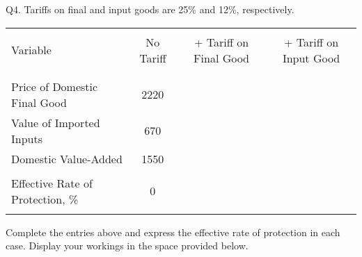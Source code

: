 \documentclass[12pt]{article}
\begin{document}
\newpage

\noindent Q4. Tariffs on final and input goods are 25\% and 12\%, respectively. 

\begin{table}[!h]
	\centering
	\begin{tabular}[t]{l c c c}
		\hline
		&&&\\
		Variable & No Tariff & + Tariff on Final Good & + Tariff on Input Good \\
		&&&\\
		\hline
		&&&\\
		Price of Domestic Final Good & 2220 & & \\
		Value of Imported Inputs & 670 & & \\
		Domestic Value-Added &	1550	&&\\
				&&&\\
		Effective Rate of Protection, \% &	0	&& \\
		&&&\\
		\hline
	\end{tabular}
\end{table}



\noindent Complete the entries above and express the effective rate of protection in each case. 
Display your workings in the space provided below.
\end{document}
